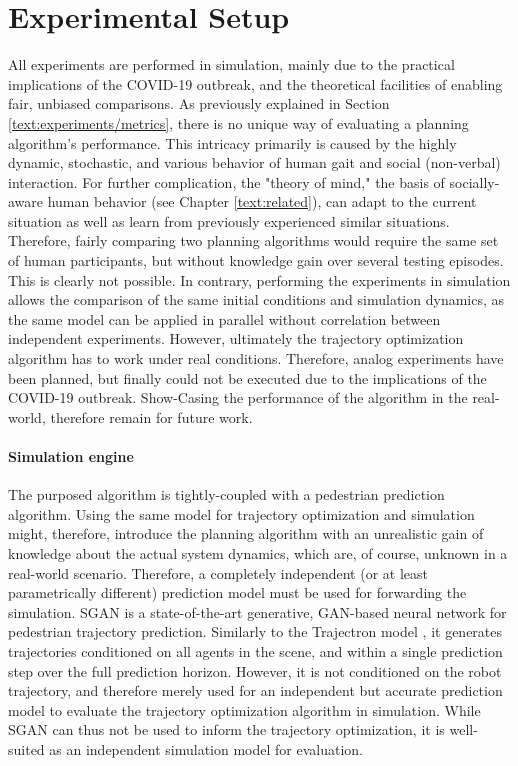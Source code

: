 \section{Experimental Setup}
\label{text:experiments/setup}
All experiments are performed in simulation, mainly due to the practical implications of the COVID-19 outbreak, and the theoretical facilities of enabling fair, unbiased comparisons. As previously explained in Section \ref{text:experiments/metrics}, there is no unique way of evaluating a planning algorithm's performance. This intricacy primarily is caused by the highly dynamic, stochastic, and various behavior of human gait and social (non-verbal) interaction. For further complication, the "theory of mind," the basis of socially-aware human behavior (see Chapter \ref{text:related}), can adapt to the current situation as well as learn from previously experienced similar situations. Therefore, fairly comparing two planning algorithms would require the same set of human participants, but without knowledge gain over several testing episodes. This is clearly not possible. In contrary, performing the experiments in simulation allows the comparison of the same initial conditions and simulation dynamics, as the same model can be applied in parallel without correlation between independent experiments. 
\newline
However, ultimately the trajectory optimization algorithm has to work under real conditions. Therefore, analog experiments have been planned, but finally could not be executed due to the implications of the COVID-19 outbreak. Show-Casing the performance of the algorithm in the real-world, therefore remain for future work.

\paragraph{Simulation engine}
The purposed algorithm is tightly-coupled with a pedestrian prediction algorithm. Using the same model for trajectory optimization and simulation might, therefore, introduce the planning algorithm with an unrealistic gain of knowledge about the actual system dynamics, which are, of course, unknown in a real-world scenario. Therefore, a completely independent (or at least parametrically different) prediction model must be used for forwarding the simulation. \ac{SGAN} \cite{Gupta2018} is a state-of-the-art generative, \ac{GAN}-based neural network for pedestrian trajectory prediction. Similarly to the Trajectron model \cite{Salzmann2020}, it generates trajectories conditioned on all agents in the scene, and within a single prediction step over the full prediction horizon. However, it is not conditioned on the robot trajectory, and therefore merely used for an independent but accurate prediction model to evaluate the trajectory optimization algorithm in simulation. While \ac{SGAN} can thus not be used to inform the trajectory optimization, it is well-suited as an independent simulation model for evaluation. 

